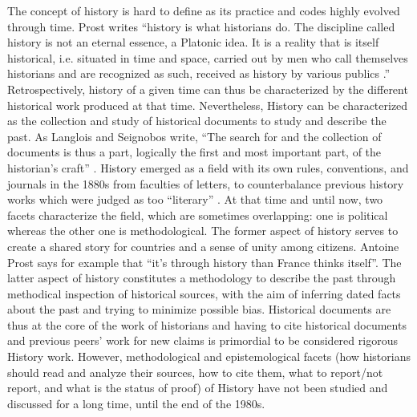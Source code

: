 The concept of history is hard to define as its practice and codes highly evolved through time.
Prost writes ``history is what historians do. The discipline called history is not an eternal essence, a Platonic idea. It is a reality that is itself historical, i.e. situated in time and space, carried out by men who call themselves historians and are recognized as such, received as history by various publics \cite{prost2014}.''
Retrospectively, history of a given time can thus be characterized by the different historical work produced at that time.
Nevertheless, History can be characterized as the collection and study of historical documents to study and describe the past.
As Langlois and Seignobos write, ``The search for and the collection of documents is thus a part, logically the first and most important part, of the historian's craft'' \cite{langloisIntroductionAuxEtudes2014}.
History emerged as a field with its own rules, conventions, and journals in the 1880s from faculties of letters, to counterbalance previous history works which were judged as too ``literary'' \cite{noirielNaissanceMetierHistorien1990}.
At that time and until now, two facets characterize the field, which are sometimes overlapping: one is political whereas the other one is methodological.
The former aspect of history serves to create a shared story for countries and a sense of unity among citizens.
Antoine Prost says for example that ``it's through history than France thinks itself''\cite{prost2014}.
The latter aspect of history constitutes a methodology to describe the past through methodical inspection of historical sources, with the aim of inferring dated facts about the past and trying to minimize possible bias.
Historical documents are thus at the core of the work of historians and having to cite historical documents and previous peers' work for new claims is primordial to be considered rigorous History work.
However, methodological and epistemological facets (how historians should read and analyze their sources, how to cite them, what to report/not report, and what is the status of proof) of History have not been studied and discussed for a long time, until the end of the 1980s\cite{prost2014}.
